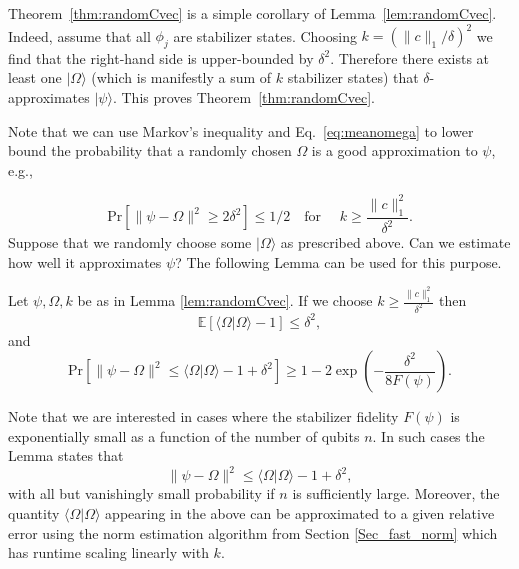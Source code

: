 Theorem~\ref{thm:randomCvec} is a simple corollary of Lemma~\ref{lem:randomCvec}.
Indeed, assume that all $\phi_j$ are stabilizer states. Choosing $k=( \| c \|_1 / \delta )^2 $ we find that the right-hand side is upper-bounded by $\delta^2$.  Therefore there exists at least one $|\Omega\rangle$ (which is manifestly a sum of $k$ stabilizer states) that $\delta$-approximates $|\psi\rangle$.  This proves Theorem~\ref{thm:randomCvec}. 

Note that we can use Markov's inequality and Eq.~\eqref{eq:meanomega} to lower bound the probability that a randomly chosen $\Omega$ is a good approximation to $\psi$, e.g., 

\[
\mathrm{Pr}\left[\| \psi -\Omega \|^2\geq 2\delta^2\right]\leq 1/2  \quad \text{for } \quad k\geq \frac{\|c \|^2_1}{\delta^2}.
\]
Suppose that we randomly choose some $|\Omega\rangle$ as prescribed above. Can we estimate how well it approximates $\psi$? The following Lemma can be used for this purpose.
\begin{lemma}
Let $\psi,\Omega,k$ be as in Lemma \ref{lem:randomCvec}.  If we choose $k\geq \frac{\|c \|^2_1}{\delta^2}$ then 
\begin{equation}
\mathbb{E}\left[\langle \Omega|\Omega\rangle-1\right] \leq \delta^2 ,
\label{eq:expomega}
\end{equation}
and
\begin{equation}
\mathrm{Pr}\left[\|\psi-\Omega\|^2\leq \langle \Omega|\Omega\rangle-1+\delta^2\right] \geq 1-2\exp{\left(-\frac{\delta^2}{8F(\psi)}\right)}.
\label{eq:event}
\end{equation}
\label{lem:tailbound}
\end{lemma}

Note that we are interested in cases where the stabilizer fidelity $F(\psi)$ is exponentially small as a function of the number of qubits $n$. In such cases the Lemma states that
\[
\|\psi-\Omega\|^2\leq \langle \Omega|\Omega\rangle-1+\delta^2 ,
\]
with all but vanishingly small probability if $n$ is sufficiently large. Moreover, the quantity $\langle \Omega|\Omega\rangle$ appearing in the above can be approximated to a given relative error using the norm estimation algorithm from Section \ref{Sec_fast_norm} which has runtime scaling linearly with $k$.  


